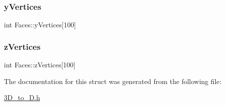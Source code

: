 \subsubsection{\texorpdfstring{y\+Vertices}{yVertices}}
{\footnotesize\ttfamily int Faces\+::y\+Vertices\mbox{[}100\mbox{]}}

\mbox{\label{struct_faces_a3116e7f7b2bc3d5487f84adc34c7c44e}} 
\subsubsection{\texorpdfstring{z\+Vertices}{zVertices}}
{\footnotesize\ttfamily int Faces\+::z\+Vertices\mbox{[}100\mbox{]}}



The documentation for this struct was generated from the following file\+:\begin{DoxyCompactItemize}
\item 
\mbox{\hyperlink{3_d__to__2_d_8h}{3\+D\+\_\+to\+\_\+D.\+h}}\end{DoxyCompactItemize}
